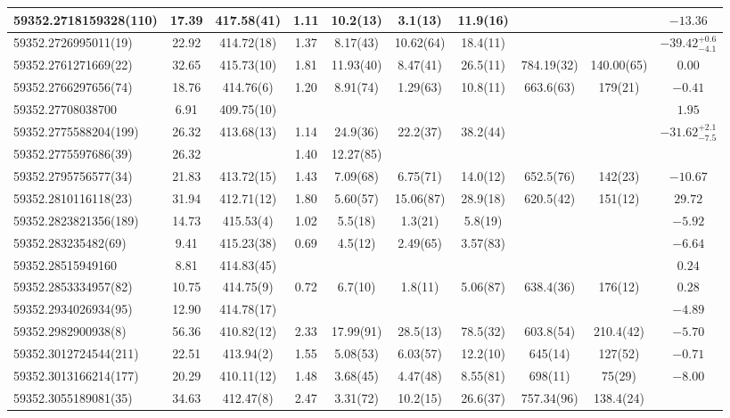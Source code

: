 {{\begin{longtable}{lccccccccc}
\hline
59352.2718159328(110) & 17.39 & 417.58(41) & 1.11 & 10.2(13) & 3.1(13)  & 11.9(16) &  &  & $-13.36$ \\
\hline
59352.2726995011(19) & 22.92 & 414.72(18) & 1.37 & 8.17(43) & 10.62(64)  & 18.4(11) &  &  & $-39.42^{+0.6}_{-4.1}$ \\
\hline
59352.2761271669(22) & 32.65 & 415.73(10) & 1.81 & 11.93(40) & 8.47(41)  & 26.5(11) & 784.19(32) & 140.00(65) & $0.00$ \\
\hline
59352.2766297656(74) & 18.76 & 414.76(6) & 1.20 & 8.91(74) & 1.29(63)  & 10.8(11) & 663.6(63) & 179(21) & $-0.41$ \\
\hline
59352.27708038700 & 6.91 & 409.75(10) &  &  &   &  &  &  & $1.95$ \\
\hline
59352.2775588204(199) & 26.32 & 413.68(13) & 1.14 & 24.9(36) & 22.2(37)  & 38.2(44) &  &  & $-31.62^{+2.1}_{-7.5}$ \\
59352.2775597686(39) & 26.32 &  & 1.40 & 12.27(85) &   &  &  &  &  \\
\hline
59352.2795756577(34) & 21.83 & 413.72(15) & 1.43 & 7.09(68) & 6.75(71)  & 14.0(12) & 652.5(76) & 142(23) & $-10.67$ \\
\hline
59352.2810116118(23) & 31.94 & 412.71(12) & 1.80 & 5.60(57) & 15.06(87)  & 28.9(18) & 620.5(42) & 151(12) & $29.72$ \\
\hline
59352.2823821356(189) & 14.73 & 415.53(4) & 1.02 & 5.5(18) & 1.3(21)  & 5.8(19) &  &  & $-5.92$ \\
\hline
59352.283235482(69) & 9.41 & 415.23(38) & 0.69 & 4.5(12) & 2.49(65)  & 3.57(83) &  &  & $-6.64$ \\
\hline
59352.28515949160 & 8.81 & 414.83(45) &  &  &  &   &  &  & $0.24$ \\
\hline
59352.2853334957(82) & 10.75 & 414.75(9) & 0.72 & 6.7(10) & 1.8(11)  & 5.06(87) & 638.4(36) & 176(12) & $0.28$ \\
\hline
59352.2934026934(95) & 12.90 & 414.78(17) &  &   &  &  &  &  & $-4.89$ \\
\hline
59352.2982900938(8) & 56.36 & 410.82(12) & 2.33 & 17.99(91) & 28.5(13)  & 78.5(32) & 603.8(54) & 210.4(42) & $-5.70$ \\
\hline
59352.3012724544(211) & 22.51 & 413.94(2) & 1.55 & 5.08(53) & 6.03(57)  & 12.2(10) & 645(14) & 127(52) & $-0.71$ \\
\hline
59352.3013166214(177) & 20.29 & 410.11(12) & 1.48 & 3.68(45) & 4.47(48)  & 8.55(81) & 698(11) & 75(29) & $-8.00$ \\
\hline
59352.3055189081(35) & 34.63 & 412.47(8) & 2.47 & 3.31(72) & 10.2(15)  & 26.6(37) & 757.34(96) & 138.4(24) &  \\

\end{longtable}}}
